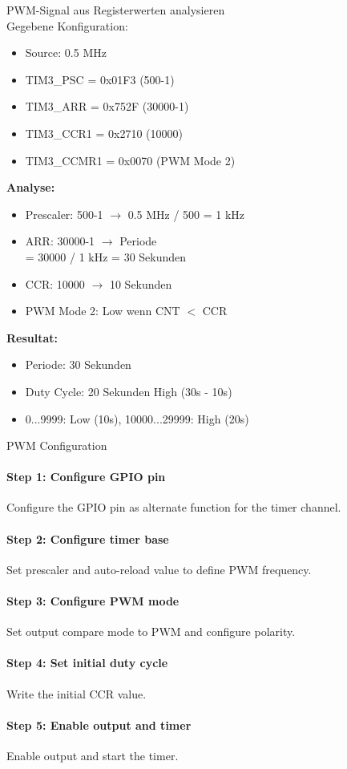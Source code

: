 \begin{example2}{PWM-Signal aus Registerwerten analysieren}\\
    Gegebene Konfiguration:
    \begin{itemize}
        \item Source: 0.5 MHz
        \item TIM3\_PSC = 0x01F3 (500-1)
        \item TIM3\_ARR = 0x752F (30000-1)
        \item TIM3\_CCR1 = 0x2710 (10000)
        \item TIM3\_CCMR1 = 0x0070 (PWM Mode 2)
    \end{itemize}
    
    \tcblower
    
    \textbf{Analyse:}
    \begin{itemize}
        \item Prescaler: 500-1 $\rightarrow$ 0.5 MHz / 500 = 1 kHz
        \item ARR: 30000-1 $\rightarrow$ Periode \\ = 30000 / 1 kHz = 30 Sekunden
        \item CCR: 10000 $\rightarrow$ 10 Sekunden
        \item PWM Mode 2: Low wenn CNT $<$ CCR
    \end{itemize}
    
    \textbf{Resultat:}
    \begin{itemize}
        \item Periode: 30 Sekunden
        \item Duty Cycle: 20 Sekunden High (30s - 10s)
        \item 0...9999: Low (10s), 10000...29999: High (20s)
    \end{itemize}
\end{example2}


\begin{KR}{PWM Configuration}
\paragraph{Step 1: Configure GPIO pin}
Configure the GPIO pin as alternate function for the timer channel.
\paragraph{Step 2: Configure timer base}
Set prescaler and auto-reload value to define PWM frequency.
\paragraph{Step 3: Configure PWM mode}
Set output compare mode to PWM and configure polarity.
\paragraph{Step 4: Set initial duty cycle}
Write the initial CCR value.
\paragraph{Step 5: Enable output and timer}
Enable output and start the timer.
\end{KR}

